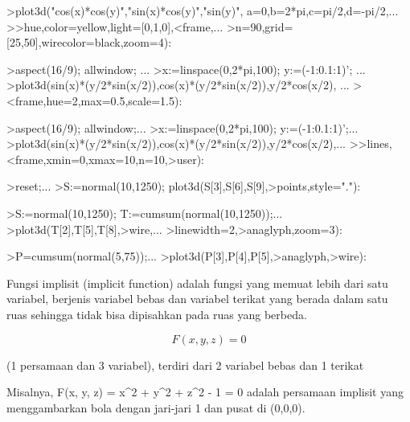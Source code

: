 \documentclass[a4paper,10pt]{article}
\begin{document}
\begin{eulernotebook}
\begin{eulercomment}
\end{eulercomment}
\begin{eulerprompt}
>plot3d("cos(x)*cos(y)","sin(x)*cos(y)","sin(y)", a=0,b=2*pi,c=pi/2,d=-pi/2,...
>>hue,color=yellow,light=[0,1,0],<frame,...
>n=90,grid=[25,50],wirecolor=black,zoom=4):
\end{eulerprompt}
\begin{eulerprompt}
>aspect(16/9); allwindow; ...
>x:=linspace(0,2*pi,100); y:=(-1:0.1:1)'; ...
>plot3d(sin(x)*(y/2*sin(x/2)),cos(x)*(y/2*sin(x/2)),y/2*cos(x/2), ...
><frame,hue=2,max=0.5,scale=1.5):
\end{eulerprompt}
\begin{eulerprompt}
>aspect(16/9); allwindow;...
>x:=linspace(0,2*pi,100); y:=(-1:0.1:1)';...
>plot3d(sin(x)*(y/2*sin(x/2)),cos(x)*(y/2*sin(x/2)),y/2*cos(x/2),...
>>lines,<frame,xmin=0,xmax=10,n=10,>user):
\end{eulerprompt}
\begin{eulerprompt}
>reset;...
>S:=normal(10,1250); plot3d(S[3],S[6],S[9],>points,style="."):
\end{eulerprompt}
\begin{eulerprompt}
>S:=normal(10,1250); T:=cumsum(normal(10,1250));...
>plot3d(T[2],T[5],T[8],>wire,...
>linewidth=2,>anaglyph,zoom=3):
\end{eulerprompt}
\begin{eulerprompt}
>P=cumsum(normal(5,75));...
>plot3d(P[3],P[4],P[5],>anaglyph,>wire):
\end{eulerprompt}
\begin{eulercomment}
Fungsi implisit (implicit function) adalah fungsi yang memuat lebih
dari satu variabel, berjenis variabel bebas dan variabel terikat yang
berada dalam satu ruas sehingga tidak bisa dipisahkan pada ruas yang
berbeda.

\end{eulercomment}
\begin{eulerformula}
\[
F(x,y,z)=0
\]
\end{eulerformula}
\begin{eulercomment}
(1 persamaan dan 3 variabel), terdiri dari 2 variabel bebas dan 1
terikat

Misalnya, F(x, y, z) = x\textasciicircum{}2 + y\textasciicircum{}2 + z\textasciicircum{}2 - 1 = 0 adalah persamaan
implisit yang menggambarkan bola dengan jari-jari 1 dan pusat di
(0,0,0).


\end{eulercomment}
\end{eulernotebook}
\end{document}
